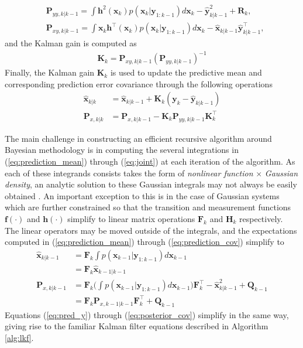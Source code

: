 \begin{align}
& \bm P_{yy,k|k-1} =  \int \mathbf{h}^2(\mathbf{x}_{k}) p(\mathbf{x}_{k}| \mathbf{y}_{1:k-1}) d\mathbf{x}_{k} - \hat{\mathbf{y}}_{k|k-1}^2 + \mathbf{R}_{k}, \label{eq:pred_cov} \\ 
& \bm P_{xy,k|k-1} =  \int \mathbf{x}_{k} \mathbf{h}^{\top}(\mathbf{x}_{k}) p(\mathbf{x}_{k}|\mathbf{y}_{1:k-1}) d\mathbf{x}_{k} - \hat{\mathbf{x}}_{k|k-1}\hat{\mathbf{y}}_{k|k-1}^{\top}, \label{eq:joint}
\end{align}
and the Kalman gain is computed as
\begin{align}
    \mathbf{K}_{k} = \bm P_{xy,k|k-1} \left(\bm P_{yy,k|k-1}\right)^{-1}
\end{align}
Finally, the Kalman gain $\mathbf{K}_{k}$ is used to update the predictive mean and corresponding prediction error covariance through the following operations
\begin{align}
\hat{\mathbf{x}}_{k|k} &= \hat{\mathbf{x}}_{k|k-1} + \mathbf{K}_{k}(\mathbf{y}_{k} -  \hat{\mathbf{y}}_{k|k-1}) \label{eq:posterior_mean} \\
\mathbf{ P}_{x,k|k}  &= \mathbf{ P}_{x,k|k-1} - \mathbf{K}_{k}\bm P_{yy,k|k-1}\mathbf{K}_{k}^{\top} \label{eq:posterior_cov}
\end{align}

The main challenge in constructing an efficient recursive algorithm around Bayesian methodology is in computing the several integrations in (\ref{eq:prediction_mean}) through (\ref{eq:joint}) at each iteration of the algorithm. As each of these integrands consists takes the form of \emph{nonlinear function} $\times$ \emph{Gaussian density}, an analytic solution to these Gaussian integrals may not always be easily obtained \cite{Arasaratnam09a}. An important exception to this is in the case of Gaussian systems which are further constrained so that the transition and measurement functions $\mathbf{f}(\cdot)$ and $\mathbf{h}(\cdot)$ simplify to linear matrix operations $\mathbf{F}_{k}$ and $\mathbf{H}_{k}$ respectively. The linear operators may be moved outside of the integrals, and the expectations computed in (\ref{eq:prediction_mean}) through (\ref{eq:prediction_cov}) simplify to
\begin{align}
\hat{\mathbf{x}}_{k|k-1} &= \mathbf{F}_{k}\int p(\mathbf{x}_{k-1}|\mathbf{y}_{1:k-1}) d\mathbf{x}_{k-1} \\
\nonumber &= \mathbf{F}_{k}\hat{\mathbf{x}}_{k-1|k-1} \\
\mathbf{ P}_{x,k|k-1}  &= \mathbf{F}_{k} \Big( \int p(\mathbf{x}_{k-1}|\mathbf{y}_{1:k-1}) d\mathbf{x}_{k-1} \Big) \mathbf{F}_{k}^{\top} -\hat{\mathbf{x}}_{k|k-1}^2 + \mathbf{Q}_{k-1} \\
\nonumber &= \mathbf{F}_{k}\mathbf{ P}_{x,k-1|k-1}\mathbf{F}_{k}^{\top} + \mathbf{Q}_{k-1}
\end{align}
Equations (\ref{eq:pred_y}) through (\ref{eq:posterior_cov}) simplify in the same way, giving rise to the familiar Kalman filter equations described in Algorithm \ref{alg:lkf}.

